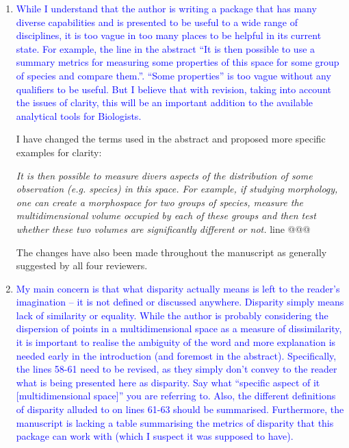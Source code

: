 \documentclass[12pt,letterpaper]{article}
\begin{document}
\begin{enumerate}

\item{\textcolor{blue}{While I understand that the author is writing a package that has many diverse capabilities and is presented to be useful to a wide range of disciplines, it is too vague in too many places to be helpful in its current state.
For example, the line in the abstract “It is then possible to use a summary metrics for measuring some properties of this space for some group of species and compare them.”.
“Some properties” is too vague without any qualifiers to be useful. But I believe that with revision, taking into account the issues of clarity, this will be an important addition to the available analytical tools for Biologists.}}

I have changed the terms used in the abstract and proposed more specific examples for clarity:

\textit{It is then possible to measure divers aspects of the distribution of some observation (e.g. species) in this space. For example, if studying morphology, one can create a morphospace for two groups of species, measure the multidimensional volume occupied by each of these groups and then test whether these two volumes are significantly different or not.} line @@@

The changes have also been made throughout the manuscript as generally suggested by all four reviewers.

\item{\textcolor{blue}{My main concern is that what disparity actually means is left to the reader’s imagination – it is not defined or discussed anywhere.
Disparity simply means lack of similarity or equality.
While the author is probably considering the dispersion of points in a multidimensional space as a measure of dissimilarity, it is important to realise the ambiguity of the word and more explanation is needed early in the introduction (and foremost in the abstract).
Specifically, the lines 58-61 need to be revised, as they simply don’t convey to the reader what is being presented here as disparity.
Say what “specific aspect of it [multidimensional space]” you are referring to.
Also, the different definitions of disparity alluded to on lines 61-63 should be summarised.
Furthermore, the manuscript is lacking a table summarising the metrics of disparity that this package can work with (which I suspect it was supposed to have).}}



\end{enumerate}
\end{document}
